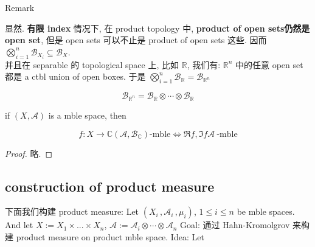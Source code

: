 \documentclass{qlnotes-export}
\begin{document}
\begin{qlremark}{Remark}

显然. \textbf{有限 index} 情况下, 在 product topology 中, \textbf{product of open sets仍然是 open set}, 但是 open sets 可以不止是 product of open sets 这些. 因而 \(\bigotimes_{i = 1}^{n}\mathcal{B}_{X_{i}} \subseteq \mathcal{B}_{X}\).\\
并且在 separable 的 topological space 上, 比如 \(\mathbb{R}\), 我们有: \({\mathbb{R}}^{n}\) 中的任意 open set 都是 a ctbl union of open boxes. 于是 \(\bigotimes_{i = 1}^{n}\mathcal{B}_{\mathbb{R}} = \mathcal{B}_{{\mathbb{R}}^{n}}\)

\end{qlremark}

\begin{example}\label{ex-06-product-measure-fubini-tonelli-example-001}

\[\mathcal{B}_{{\mathbb{R}}^{n}} = \mathcal{B}_{\mathbb{R}} \otimes \cdots \otimes \mathcal{B}_{\mathbb{R}}\]

\end{example}

\begin{corollary}\label{cor-06-product-measure-fubini-tonelli-corollary-001}

if \((X,\mathcal{A})\) is a mble space, then

\[f:X\rightarrow{\mathbb{C}}(\mathcal{A},\mathcal{B}_{\mathbb{C}})\text{-mble}\Leftrightarrow\Re f,\Im f\mathcal{A}\ \text{-mble}\]

\end{corollary}

\begin{proof}

略.

\end{proof}

\subsection{construction of product measure}\label{construction-of-product-measure}

下面我们构建 product measure: Let \((X_{i}\,,\mathcal{A}_{i}\,,\mu_{i})\), \(1 \leq i \leq n\) be mble spaces.\\
And let \(X := X_{1} \times ... \times X_{n}\), \(\mathcal{A} := \mathcal{A}_{i} \otimes \cdots \otimes \mathcal{A}_{n}\) Goal: 通过 Hahn-Kromolgrov 来构建 product measure on product mble space. Idea: Let
\end{document}
